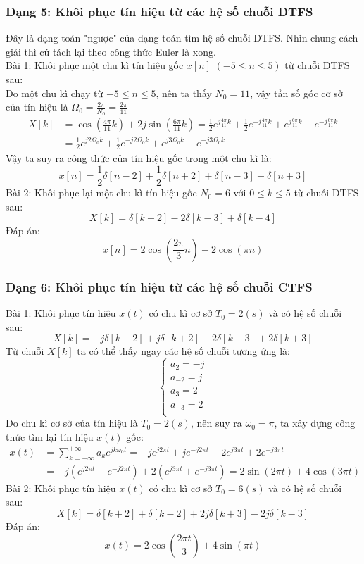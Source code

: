 \documentclass{article}
\begin{document}
\subsubsection{Dạng 5: Khôi phục tín hiệu từ các hệ số chuỗi DTFS}
Đây là dạng toán "ngược" của dạng toán tìm hệ số chuỗi DTFS. Nhìn chung cách giải thì cứ tách lại theo công thức Euler là xong.
\\ Bài 1: Khôi phục một chu kì tín hiệu gốc $x[n]$ $(-5\leq n\leq 5)$ từ chuỗi DTFS sau:
\\ Do một chu kì chạy từ $-5\leq n\leq 5$, nên ta thấy $N_{0}=11$, vậy tần số góc cơ sở của tín hiệu là $\Omega_{0}=\frac{2\pi}{N_{0}}=\frac{2\pi}{11}$
\begin{equation*}
    \begin{split}
X[k]&=\cos{\left(\frac{4\pi}{11}k\right)}+2j\sin{\left(\frac{6\pi}{11}k\right)}=\frac{1}{2}e^{j\frac{4\pi}{11}k}+\frac{1}{2}e^{-j\frac{4\pi}{11}k}+e^{j\frac{6\pi}{11}k}-e^{-j\frac{6\pi}{11}k}\\&=\frac{1}{2}e^{j2\Omega_{0}k}+\frac{1}{2}e^{-j2\Omega_{0}k}+e^{j3\Omega_{0}k}-e^{-j3\Omega_{0}k}
    \end{split}
\end{equation*}
Vậy ta suy ra công thức của tín hiệu gốc trong một chu kì là:
$$x[n]=\frac{1}{2}\delta{[n-2]}+\frac{1}{2}\delta{[n+2]}+\delta{[n-3]}-\delta{[n+3]}$$
Bài 2: Khôi phục lại một chu kì tín hiệu gốc $N_{0}=6$ với $0\leq k \leq5$ từ chuỗi DTFS sau:
$$X[k]=\delta{[k-2]}-2\delta{[k-3]}+\delta{[k-4]}$$
Đáp án: 
$$x[n]=2\cos{\left(\frac{2\pi}{3}n\right)}-2\cos{(\pi n)}$$
\subsubsection{Dạng 6: Khôi phục tín hiệu từ các hệ số chuỗi CTFS}
Bài 1: Khôi phục tín hiệu $x(t)$ có chu kì cơ sở $T_{0}=2(s)$ và có hệ số chuỗi sau:
$$X[k]=-j\delta{[k-2]}+j\delta{[k+2]}+2\delta{[k-3]}+2\delta{[k+3]}$$
Từ chuỗi $X[k]$ ta có thể thấy ngay các hệ số chuỗi tương ứng là:
\begin{equation*}
    \begin{cases}
        a_{2}=-j \\
        a_{-2}=j\\
        a_{3}=2\\
        a_{-3}=2\\
    \end{cases}
\end{equation*}
Do chu kì cơ sở của tín hiệu là $T_{0}=2(s)$, nên suy ra $\omega_{0}=\pi$, ta xây dựng công thức tìm lại tín hiệu $x(t)$ gốc:
\begin{equation*}
    \begin{split}
x(t)&=\sum_{k=-\infty}^{+\infty}a_{k}e^{jk\omega_{0}t}=-je^{j2\pi t}+je^{-j2\pi t}+2e^{j3\pi t}+2e^{-j3\pi t}\\&=-j(e^{j2\pi t}-e^{-j2\pi t})+2(e^{j3\pi t}+e^{-j 3\pi t})=2\sin{(2\pi t)}+4\cos{(3\pi t)}
    \end{split}
\end{equation*}
Bài 2: Khôi phục tín hiệu $x(t)$ có chu kì cơ sở $T_{0}=6(s)$ và có hệ số chuỗi sau:
$$X[k]=\delta{[k+2]}+\delta{[k-2]}+2j\delta{[k+3]}-2j\delta{[k-3]}$$
Đáp án: $$x(t)=2\cos{\left(\frac{2\pi t}{3}\right)}+4\sin{(\pi t)}$$
\end{document}
